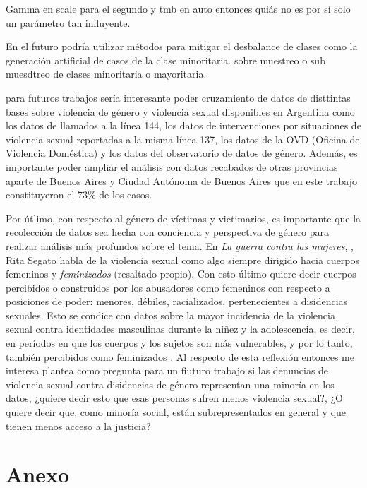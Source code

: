 \documentclass[10 pt]{article}
\begin{document}
Gamma en scale para el segundo y tmb en auto entonces quiás no es por sí solo un parámetro tan influyente.

En el futuro podría utilizar métodos para mitigar el desbalance de clases como la generación artificial de casos de la clase minoritaria. sobre muestreo o sub muesdtreo de clases minoritaria o mayoritaria. 

para futuros trabajos sería interesante poder cruzamiento de datos de disttintas bases sobre violencia de género y violencia sexual disponibles en Argentina como los datos de llamados a la línea 144, los datos de intervenciones por situaciones de violencia sexual reportadas a la misma línea 137, los datos de la OVD (Oficina de Violencia Doméstica) y los datos del observatorio de datos de género. Además, es importante poder ampliar el análisis con datos recabados de otras provincias aparte de Buenos Aires y Ciudad Autónoma de Buenos Aires que en este trabajo constituyeron el 73\% de los casos.

Por útlimo, con respecto al género de víctimas y victimarios, es importante que la recolección de datos sea hecha con conciencia y perspectiva de género para realizar análisis más profundos sobre el tema. En \textit{La guerra contra las mujeres}, \citeyearpar{segato2016guerra}, Rita Segato habla de la violencia sexual como algo siempre dirigido hacia cuerpos femeninos y \textit{feminizados} (resaltado propio). Con esto último quiere decir cuerpos percibidos o construidos por los abusadores como femeninos con respecto a posiciones de poder: menores, débiles, racializados, pertenecientes a disidencias sexuales. Esto se condice con datos sobre la mayor incidencia de la violencia sexual contra identidades masculinas durante la niñez y la adolescencia, es decir, en períodos en que los cuerpos y los sujetos son más vulnerables, y por lo tanto, también percibidos como feminizados \citep*{contreras2016violencia,ufem_relevamiento,ferris2002world}. Al respecto de esta reflexión entonces me interesa plantea como pregunta para un fiuturo trabajo si las denuncias de violencia sexual contra disidencias de género representan una minoría en los datos, ¿quiere decir esto que esas personas sufren menos violencia sexual?, ¿O quiere decir que, como minoría social, están subrepresentados en general y que tienen menos acceso a la justicia?


\newpage




\newpage
\section{Anexo}\label{anex}
\end{document}
